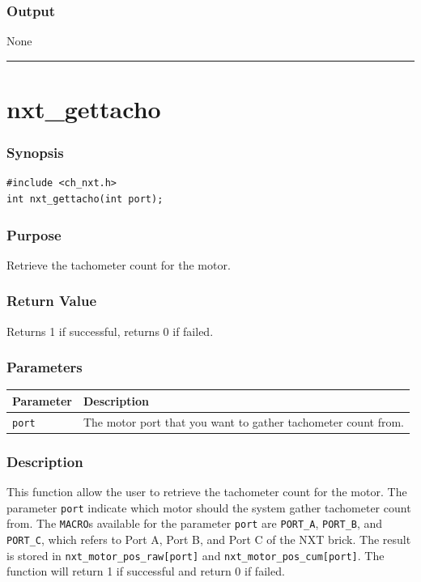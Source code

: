 \documentclass[12pt]{article}
\begin{document}
\subsubsection*{Output}
None 
\\

\hrule
\newpage
\section*{nxt\_gettacho}

\subsubsection*{Synopsis}
\begin{verbatim}
#include <ch_nxt.h>
int nxt_gettacho(int port);
\end{verbatim}

\subsubsection*{Purpose}
Retrieve the tachometer count for the motor.

\subsubsection*{Return Value}
Returns 1 if successful, returns 0 if failed.

\subsubsection*{Parameters}
\begin{tabular}{ l | p{12cm} }
Parameter			& Description\\ \hline
\verb+port+			& The motor port that you want to gather tachometer count from. 
\end{tabular}

\subsubsection*{Description}
This function allow the user to retrieve the tachometer count for the motor. The parameter \verb+port+ indicate which motor should the system gather tachometer count from. The \verb+MACRO+s available for the parameter \verb+port+ are \verb+PORT_A+, \verb+PORT_B+, and \verb+PORT_C+, which refers to Port A, Port B, and Port C of the NXT brick. The result is stored in \verb+nxt_motor_pos_raw[port]+ and \verb+nxt_motor_pos_cum[port]+. The function will return 1 if successful and return 0 if failed.
\end{document}
